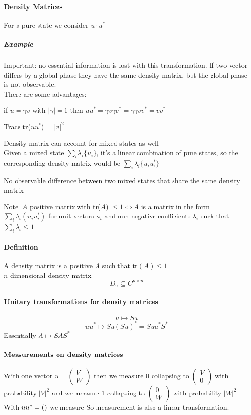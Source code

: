 \documentclass[10pt]{report}
\begin{document}
\paragraph{Density Matrices} For a pure state we consider $u\cdot u^*$
\subparagraph{Example} %
Important: no essential information is lost with this transformation. If two vector differs by a global phase they have the same density matrix, but the global phase is not observable.\\
There are some advantages:
\begin{list}{}{}
	\item if $u = \gamma v$ with $|\gamma|=1$ then $uu^* = \gamma v\overline{\gamma}v^* = \gamma\overline{\gamma}vv^* = vv^*$
	\item Trace tr($uu^*$) = $|u|^2$
	\item Density matrix can account for mixed states as well\\
	Given a mixed state $\sum_i \lambda_i\{u_i\}$, it's a linear combination of pure states, so the corresponding density matrix would be $\sum_i \lambda_i \{u_iu_i^*\}$
	\item No observable difference between two mixed states that share the same density matrix
\end{list}
Note: $A$ positive matrix with tr($A$) $\leq 1\Leftrightarrow A$ is a matrix in the form $\sum_i \lambda_i(u_iu_i^*)$ for unit vectors $u_i$ and non-negative coefficients $\lambda_i$ such that $\sum_i \lambda_i \leq 1$
\paragraph{Definition} A density matrix is a positive $A$ such that tr$(A)\leq 1$\\
$n$ dimensional density matrix
$$D_n\subseteq C^{n\times n}$$
\paragraph{Unitary transformations for density matrices}
$$u\mapsto Su$$
$$uu^*\mapsto Su(Su)^* = Suu^*S^*$$
Essentially $A\mapsto SAS^*$
\paragraph{Measurements on density matrices} With one vector $u=\left(\begin{array}{c}
V\\W
\end{array}\right)$ then we measure 0 collapsing to $\left(\begin{array}{c}
V\\0
\end{array}\right)$ with probability $|V|^2$ and we measure 1 collapsing to $\left(\begin{array}{c}
0\\W
\end{array}\right)$ with probability $|W|^2$.\\
With $uu^* = \left(\begin{array}{c c}

\end{array}\right)$ we measure %
So measurement is also a linear transformation.
\end{document}
